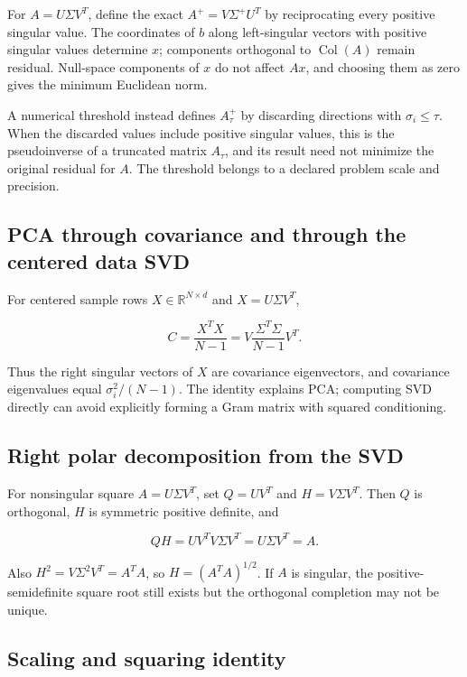 For \(A=U\Sigma V^T\), define the exact \(A^+=V\Sigma^+U^T\) by reciprocating every positive singular value. The coordinates of \(b\) along left-singular vectors with positive singular values determine \(x\); components orthogonal to \(\operatorname{Col}(A)\) remain residual. Null-space components of \(x\) do not affect \(Ax\), and choosing them as zero gives the minimum Euclidean norm.

A numerical threshold instead defines \(A_\tau^+\) by discarding directions with \(\sigma_i\le\tau\). When the discarded values include positive singular values, this is the pseudoinverse of a truncated matrix \(A_\tau\), and its result need not minimize the original residual for \(A\). The threshold belongs to a declared problem scale and precision.

\subsection{PCA through covariance and through the centered data SVD}\label{02-foundations-ii-ch039-pca-through-covariance-and-through-the-centered-data-svd}

For centered sample rows \(X\in\mathbb R^{N\times d}\) and \(X=U\Sigma V^T\),

\[
C=\frac{X^TX}{N-1}
=V\frac{\Sigma^T\Sigma}{N-1}V^T.
\]

Thus the right singular vectors of \(X\) are covariance eigenvectors, and covariance eigenvalues equal \(\sigma_i^2/(N-1)\). The identity explains PCA; computing SVD directly can avoid explicitly forming a Gram matrix with squared conditioning.

\subsection{Right polar decomposition from the SVD}\label{02-foundations-ii-ch039-right-polar-decomposition-from-the-svd}

For nonsingular square \(A=U\Sigma V^T\), set \(Q=UV^T\) and \(H=V\Sigma V^T\). Then \(Q\) is orthogonal, \(H\) is symmetric positive definite, and

\[
QH=UV^TV\Sigma V^T=U\Sigma V^T=A.
\]

Also \(H^2=V\Sigma^2V^T=A^TA\), so \(H=(A^TA)^{1/2}\). If \(A\) is singular, the positive-semidefinite square root still exists but the orthogonal completion may not be unique.

\subsection{Scaling and squaring identity}\label{02-foundations-ii-ch039-scaling-and-squaring-identity}

